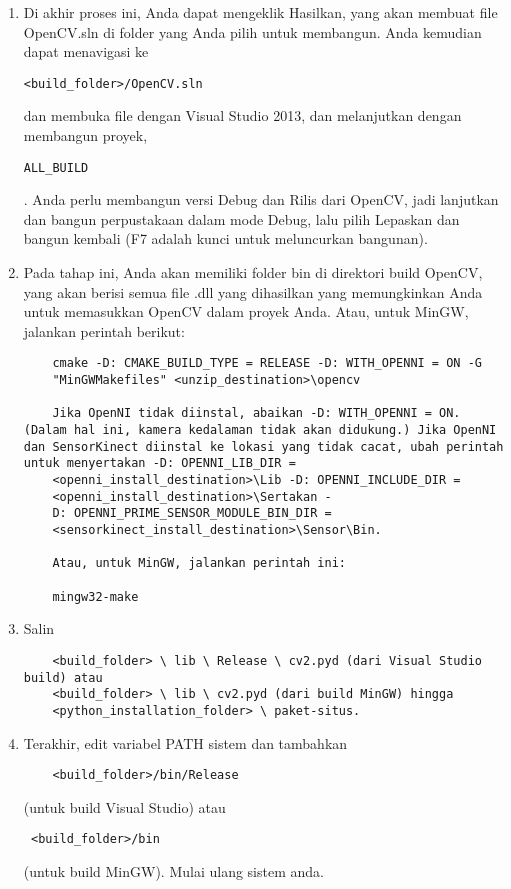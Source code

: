 \begin{enumerate}
	\item Di akhir proses ini, Anda dapat mengeklik Hasilkan, yang akan membuat file OpenCV.sln di folder yang Anda pilih untuk membangun. Anda kemudian dapat menavigasi ke \begin{verbatim}<build_folder>/OpenCV.sln\end{verbatim} dan membuka file dengan Visual Studio 2013, dan melanjutkan dengan membangun proyek, \begin{verbatim}ALL_BUILD\end{verbatim}. Anda perlu membangun versi Debug dan Rilis dari OpenCV, jadi lanjutkan dan bangun perpustakaan dalam mode Debug, lalu pilih Lepaskan dan bangun kembali (F7 adalah kunci untuk meluncurkan bangunan).
	\item Pada tahap ini, Anda akan memiliki folder bin di direktori build OpenCV, yang akan berisi semua file .dll yang dihasilkan yang memungkinkan Anda untuk memasukkan OpenCV dalam proyek Anda. Atau, untuk MinGW, jalankan perintah berikut:
	\begin{verbatim}
	cmake -D: CMAKE_BUILD_TYPE = RELEASE -D: WITH_OPENNI = ON -G
	"MinGWMakefiles" <unzip_destination>\opencv

	Jika OpenNI tidak diinstal, abaikan -D: WITH_OPENNI = ON. (Dalam hal ini, kamera kedalaman tidak akan didukung.) Jika OpenNI dan SensorKinect diinstal ke lokasi yang tidak cacat, ubah perintah untuk menyertakan -D: OPENNI_LIB_DIR =
	<openni_install_destination>\Lib -D: OPENNI_INCLUDE_DIR =
	<openni_install_destination>\Sertakan -
	D: OPENNI_PRIME_SENSOR_MODULE_BIN_DIR =
	<sensorkinect_install_destination>\Sensor\Bin.

	Atau, untuk MinGW, jalankan perintah ini:

	mingw32-make
	\end{verbatim}
	\item Salin 
	\begin{verbatim}
	<build_folder> \ lib \ Release \ cv2.pyd (dari Visual Studio build) atau
	<build_folder> \ lib \ cv2.pyd (dari build MinGW) hingga
	<python_installation_folder> \ paket-situs.
	\end{verbatim}
	\item Terakhir, edit variabel PATH sistem dan tambahkan
	\begin{verbatim} 
	<build_folder>/bin/Release \end{verbatim}
	(untuk build Visual Studio) atau 
	\begin{verbatim} <build_folder>/bin \end{verbatim}(untuk build MinGW). Mulai ulang sistem anda.

\end{enumerate}
\newpage
